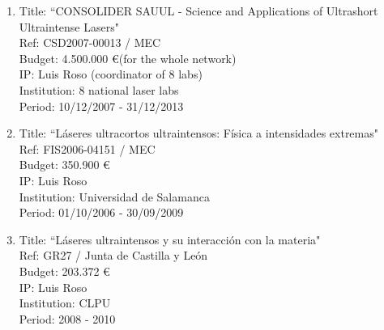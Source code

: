 \begin{enumerate}
\item Title: ``CONSOLIDER SAUUL - Science and Applications of Ultrashort Ultraintense Lasers"\\
Ref:  CSD2007-00013     / MEC \\
Budget:  4.500.000 \euro (for the whole network) \\
IP:  Luis Roso (coordinator of 8 labs) \\
Institution:  8 national laser labs \\
Period:  10/12/2007 - 31/12/2013 \\

\item Title: ``L\'aseres ultracortos ultraintensos: F\'isica a intensidades extremas"\\
Ref:  FIS2006-04151     / MEC \\
Budget:  350.900  \euro \\
IP:  Luis Roso \\
Institution: Universidad de Salamanca \\
Period: 01/10/2006 - 30/09/2009 \\



\item Title: ``L\'aseres ultraintensos y su interacci\'on con la materia"\\
Ref:    GR27   / Junta de Castilla y Le\'on \\
Budget: 203.372 \euro \\
IP:  Luis Roso \\
Institution:  CLPU \\
Period: 2008 - 2010



\end{enumerate}

